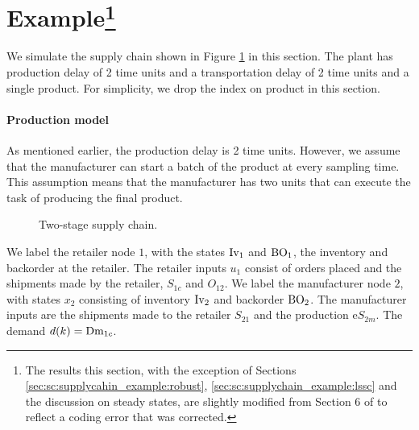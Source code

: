 \section{Example\footnote{The results this section, with the exception of
Sections \ref{sec:sc:supplycahin_example:robust},
\ref{sec:sc:supplychain_example:lssc} and the discussion on steady states, are slightly modified from Section 6 of
\citet{subramanian:rawlings:maravelias:2012} to reflect a coding error
that was corrected. }}
\label{sec:sc:supplychain_example}
We simulate the supply chain shown in Figure \ref{fig:sc:2stage} in this
section. The plant  has production delay of 2 time units and a
transportation delay of 2 time units and a single product. For
simplicity, we drop the index on product in this section. 

\paragraph{Production model}
As mentioned earlier, the production delay is 2 time units. However,
we assume that the manufacturer can start a batch of the product at
every sampling time. This assumption means that the manufacturer has
two units that can execute the task of producing the final product. 

\begin{figure}
\centering
\resizebox{0.75\textwidth}{!}{}
\caption{Two-stage supply chain.}
\label{fig:sc:2stage}
\end{figure}
We label the retailer node $1$, with the states $\textrm{Iv}_1$ and
$\textrm{BO}_1$, the inventory and backorder at the retailer. The retailer
inputs $u_1$ consist of orders placed  and the shipments made by the retailer, $S_{1c}$ and
$O_{12}$.
We label the manufacturer  node $2$, with states $x_2$ consisting of
inventory $\textrm{Iv}_2$ and backorder $\textrm{BO}_2$. The manufacturer inputs
are the shipments made to the retailer $S_{21}$ and the production
e$S_{2m}$.  The demand $d(k) = \textrm{Dm}_{1c}$. 

